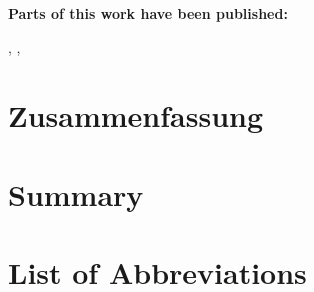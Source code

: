\documentclass[english,12pt]{report}
\begin{document}
\begin{spacing}{1.5}
\noindent \textbf{Parts of this work have been published:}\\


\citep{haeusler2021speechanno},
\citep{halchenko2021datalad},
\citep{haeusler2021ppadata}




\chapter*{Zusammenfassung}
\setcounter{page}{1}








\chapter*{Summary}





\chapter*{List of Abbreviations}




\end{spacing}
\end{document}
